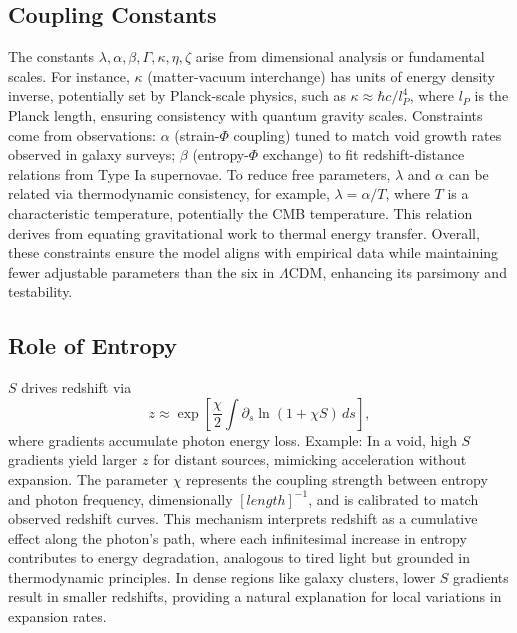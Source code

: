 \documentclass[11pt]{article}
\theoremstyle{plain}
\theoremstyle{definition}
\begin{document}
\subsection{Coupling Constants}
The constants $\lambda, \alpha, \beta, \Gamma, \kappa, \eta, \zeta$ arise from dimensional analysis or fundamental scales. For instance, $\kappa$ (matter-vacuum interchange) has units of energy density inverse, potentially set by Planck-scale physics, such as $\kappa \approx \hbar c / l_P^4$, where $l_P$ is the Planck length, ensuring consistency with quantum gravity scales. Constraints come from observations: $\alpha$ (strain-$\Phi$ coupling) tuned to match void growth rates observed in galaxy surveys; $\beta$ (entropy-$\Phi$ exchange) to fit redshift-distance relations from Type Ia supernovae. To reduce free parameters, $\lambda$ and $\alpha$ can be related via thermodynamic consistency, for example, $\lambda = \alpha / T$, where $T$ is a characteristic temperature, potentially the CMB temperature. This relation derives from equating gravitational work to thermal energy transfer. Overall, these constraints ensure the model aligns with empirical data while maintaining fewer adjustable parameters than the six in $\Lambda$CDM, enhancing its parsimony and testability.
\subsection{Role of Entropy}
$S$ drives redshift via 
\begin{equation}
z \approx \exp\left[\frac{\chi}{2} \int \partial_s \ln(1 + \chi S) \, ds\right],
\label{eq:redshift}
\end{equation}
where gradients accumulate photon energy loss. Example: In a void, high $S$ gradients yield larger $z$ for distant sources, mimicking acceleration without expansion. The parameter $\chi$ represents the coupling strength between entropy and photon frequency, dimensionally $[length]^{-1}$, and is calibrated to match observed redshift curves. This mechanism interprets redshift as a cumulative effect along the photon's path, where each infinitesimal increase in entropy contributes to energy degradation, analogous to tired light but grounded in thermodynamic principles. In dense regions like galaxy clusters, lower $S$ gradients result in smaller redshifts, providing a natural explanation for local variations in expansion rates.
\end{document}
